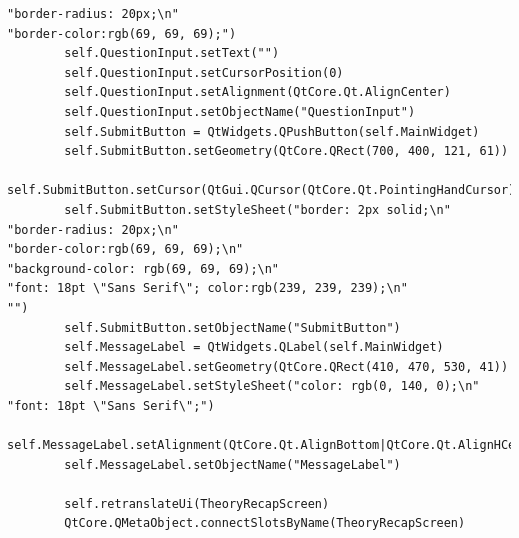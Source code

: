 \documentclass[12pt]{article}
\begin{document}
\begin{lstlisting}
"border-radius: 20px;\n"
"border-color:rgb(69, 69, 69);")
        self.QuestionInput.setText("")
        self.QuestionInput.setCursorPosition(0)
        self.QuestionInput.setAlignment(QtCore.Qt.AlignCenter)
        self.QuestionInput.setObjectName("QuestionInput")
        self.SubmitButton = QtWidgets.QPushButton(self.MainWidget)
        self.SubmitButton.setGeometry(QtCore.QRect(700, 400, 121, 61))
        self.SubmitButton.setCursor(QtGui.QCursor(QtCore.Qt.PointingHandCursor))
        self.SubmitButton.setStyleSheet("border: 2px solid;\n"
"border-radius: 20px;\n"
"border-color:rgb(69, 69, 69);\n"
"background-color: rgb(69, 69, 69);\n"
"font: 18pt \"Sans Serif\"; color:rgb(239, 239, 239);\n"
"")
        self.SubmitButton.setObjectName("SubmitButton")
        self.MessageLabel = QtWidgets.QLabel(self.MainWidget)
        self.MessageLabel.setGeometry(QtCore.QRect(410, 470, 530, 41))
        self.MessageLabel.setStyleSheet("color: rgb(0, 140, 0);\n"
"font: 18pt \"Sans Serif\";")
        self.MessageLabel.setAlignment(QtCore.Qt.AlignBottom|QtCore.Qt.AlignHCenter)
        self.MessageLabel.setObjectName("MessageLabel")

        self.retranslateUi(TheoryRecapScreen)
        QtCore.QMetaObject.connectSlotsByName(TheoryRecapScreen)


\end{lstlisting}
\end{document}
